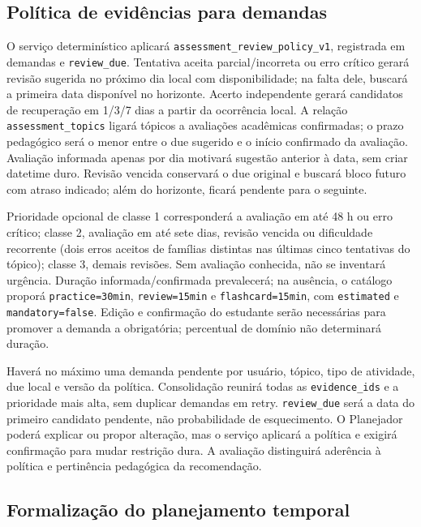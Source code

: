 \documentclass[12pt]{article}
\newcommand{\code}[1]{\nolinkurl{#1}}
\begin{document}
\subsection{Política de evidências para demandas}

O serviço determinístico aplicará \code{assessment_review_policy_v1}, registrada em demandas e \code{review_due}. Tentativa aceita parcial/incorreta ou erro crítico gerará revisão sugerida no próximo dia local com disponibilidade; na falta dele, buscará a primeira data disponível no horizonte. Acerto independente gerará candidatos de recuperação em 1/3/7 dias a partir da ocorrência local. A relação \code{assessment_topics} ligará tópicos a avaliações acadêmicas confirmadas; o prazo pedagógico será o menor entre o due sugerido e o início confirmado da avaliação. Avaliação informada apenas por dia motivará sugestão anterior à data, sem criar datetime duro. Revisão vencida conservará o due original e buscará bloco futuro com atraso indicado; além do horizonte, ficará pendente para o seguinte.

Prioridade opcional de classe 1 corresponderá a avaliação em até 48 h ou erro crítico; classe 2, avaliação em até sete dias, revisão vencida ou dificuldade recorrente (dois erros aceitos de famílias distintas nas últimas cinco tentativas do tópico); classe 3, demais revisões. Sem avaliação conhecida, não se inventará urgência. Duração informada/confirmada prevalecerá; na ausência, o catálogo proporá \code{practice=30min}, \code{review=15min} e \code{flashcard=15min}, com \code{estimated} e \code{mandatory=false}. Edição e confirmação do estudante serão necessárias para promover a demanda a obrigatória; percentual de domínio não determinará duração.

Haverá no máximo uma demanda pendente por usuário, tópico, tipo de atividade, due local e versão da política. Consolidação reunirá todas as \code{evidence_ids} e a prioridade mais alta, sem duplicar demandas em retry. \code{review_due} será a data do primeiro candidato pendente, não probabilidade de esquecimento. O Planejador poderá explicar ou propor alteração, mas o serviço aplicará a política e exigirá confirmação para mudar restrição dura. A avaliação distinguirá aderência à política e pertinência pedagógica da recomendação.

\subsection{Formalização do planejamento temporal}
\end{document}

